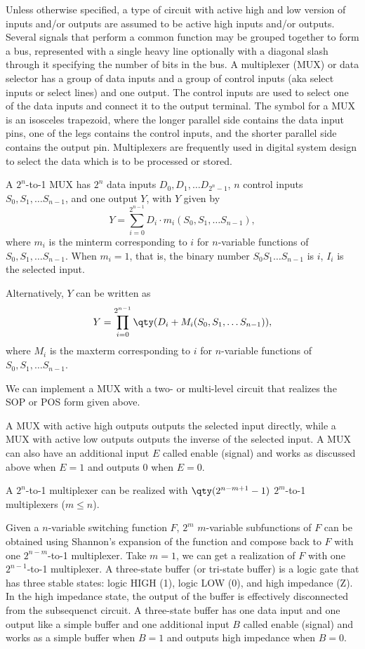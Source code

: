 \documentclass[a4paper,12pt]{article}
\begin{document}
\begin{itemize}
\begin{itemize}
\begin{itemize}
\begin{itemize}
\begin{itemize}
\begin{itemize}
\begin{itemize}
Unless otherwise specified, a type of circuit with active high and low version of inputs and/or outputs are assumed to be active high inputs and/or outputs.
Several signals that perform a common function may be grouped together to form a bus, represented with a single heavy line optionally with a diagonal slash through it specifying the number of bits in the bus.
A multiplexer (MUX) or data selector has a group of data inputs and a group of control inputs (aka select inputs or select lines) and one output. The control inputs are used to select one of the data inputs and connect it to the output terminal. The symbol for a MUX is an isosceles trapezoid, where the longer parallel side contains the data input pins, one of the legs contains the control inputs, and the shorter parallel side contains the output pin. Multiplexers are frequently used in digital system design to select the data which is to be processed or stored.

A $2^n$-to-1 MUX has $2^n$ data inputs $D_0,D_1,\ldots D_{2^n-1}$, $n$ control inputs $S_0,S_1,\ldots S_{n-1}$, and one output $Y$, with $Y$ given by
\[Y=\sum_{i=0}^{2^{n-1}}D_i\cdot m_i(S_0,S_1,\ldots S_{n-1}),\]
where $m_i$ is the minterm corresponding to $i$ for $n$-variable functions of $S_0,S_1,\ldots S_{n-1}$. When $m_i=1$, that is, the binary number $S_0S_1\ldots S_{n-1}$ is $i$, $I_i$ is the selected input.

Alternatively, $Y$ can be written as
\[Y=\prod_{i=0}^{2^{n-1}}\qty(D_i+M_i(S_0,S_1,\ldots S_{n-1})),\]
where $M_i$ is the maxterm corresponding to $i$ for $n$-variable functions of $S_0,S_1,\ldots S_{n-1}$.

We can implement a MUX with a two- or multi-level circuit that realizes the SOP or POS form given above.

A MUX with active high outputs outputs the selected input directly, while a MUX with active low outputs outputs the inverse of the selected input. A MUX can also have an additional input $E$ called enable (signal) and works as discussed above when $E=1$ and outputs $0$ when $E=0$.

A $2^n$-to-1 multiplexer can be realized with $\qty(2^{n-m+1}-1)$ $2^m$-to-1 multiplexers ($m\leq n$).

Given a $n$-variable switching function $F$, $2^m$ $m$-variable subfunctions of $F$ can be obtained using Shannon's expansion of the function and compose back to $F$ with one $2^{n-m}$-to-1 multiplexer. Take $m=1$, we can get a realization of $F$ with one $2^{n-1}$-to-1 multiplexer.
A three-state buffer (or tri-state buffer) is a logic gate that has three stable states: logic HIGH (1), logic LOW (0), and high impedance (Z). In the high impedance state, the output of the buffer is effectively disconnected from the subsequenct circuit. A three-state buffer has one data input and one output like a simple buffer and one additional input $B$ called enable (signal) and works as a simple buffer when $B=1$ and outputs high impedance when $B=0$.


\end{itemize}
\end{itemize}
\end{itemize}
\end{itemize}
\end{itemize}
\end{itemize}
\end{itemize}
\end{document}
